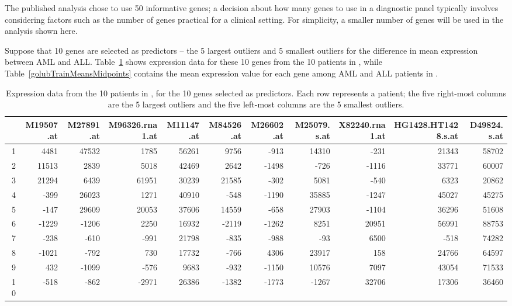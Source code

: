 The published analysis chose to use 50 informative genes; a decision about how many genes to use in a diagnostic panel typically involves considering factors such as the number of genes practical for a clinical setting. For simplicity, a smaller number of genes will be used in the analysis shown here. 

Suppose that 10 genes are selected as predictors -- the 5 largest outliers and 5 smallest outliers for the difference in mean expression between AML and ALL. Table~\ref{golubTestData} shows expression data for these 10 genes from the 10 patients in , while Table~\ref{golubTrainMeansMidpoints} contains the mean expression value for each gene among AML and ALL patients in .

\begin{table}[ht]
	\tiny
	\centering
	\begin{tabular}{r|rrrrr|rrrrr}
		\hline
		& M19507.at & M27891.at & M96326.rna1.at & M11147.at & M84526.at & M26602.at & M25079.s.at & X82240.rna1.at & HG1428.HT1428.s.at & D49824.s.at \\ 
		\hline
		1&4481 & 47532 & 1785 & 56261 & 9756 & -913 & 14310 & -231 & 21343 & 58702 \\ 
		2&11513 & 2839 & 5018 & 42469 & 2642 & -1498 & -726 & -1116 & 33771 & 60007 \\ 
		3&21294 & 6439 & 61951 & 30239 & 21585 & -302 & 5081 & -540 & 6323 & 20862 \\ 
		4&-399 & 26023 & 1271 & 40910 & -548 & -1190 & 35885 & -1247 & 45027 & 45275 \\ 
		5&-147 & 29609 & 20053 & 37606 & 14559 & -658 & 27903 & -1104 & 36296 & 51608 \\ 
		6&-1229 & -1206 & 2250 & 16932 & -2119 & -1262 & 8251 & 20951 & 56991 & 88753 \\ 
		7&-238 & -610 & -991 & 21798 & -835 & -988 & -93 & 6500 & -518 & 74282 \\ 
		8&-1021 & -792 & 730 & 17732 & -766 & 4306 & 23917 & 158 & 24766 & 64597 \\ 
		9&432 & -1099 & -576 & 9683 & -932 & -1150 & 10576 & 7097 & 43054 & 71533 \\ 
		10&-518 & -862 & -2971 & 26386 & -1382 & -1773 & -1267 & 32706 & 17306 & 36460 \\ 
		\hline
	\end{tabular}
	\caption{Expression data from the 10 patients in , for the 10 genes selected as predictors. Each row represents a patient; the five right-most columns are the 5 largest outliers and the five left-most columns are the 5 smallest outliers.}
	\label{golubTestData}
\end{table}

